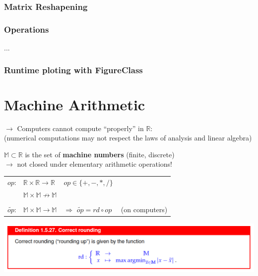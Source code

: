 \documentclass[12pt, a4paper]{article}
\newcommand{\R}{\mathbb{R}}
\newcommand{\M}{\mathbb{M}}
\begin{document}
\subsubsection{Matrix Reshapening}


\subsubsection{Operations}
...


\subsubsection{Runtime ploting with FigureClass}



\newpage
\section{Machine Arithmetic}

$\rightarrow$ Computers cannot compute “properly” in $\R$: \\
(numerical computations may not respect the laws of analysis and linear algebra)\newline

$\M \subset \R$ is the set of \textbf{machine numbers} (finite, discrete) \\
$\rightarrow$ not closed under elementary arithmetic operations! \\

\begin{tabular}{lll}
	$op$: 	& 		$\R \times \R \rightarrow \R$ & 			$op \in \lbrace +, -, *, / \rbrace$	\\
			& 		$\M \times \M \not\rightarrow \M$  											\\
																								\\
	$\widetilde{op}$: &  		$\M \times \M \rightarrow \M$ 	& $\Rightarrow$ $\widetilde{op} = rd \circ op \quad $ (on computers) 
\end{tabular}

\begin{center}
	\includegraphics[width=1.0\textwidth]{rounding_function.png}
\end{center}
\end{document}
